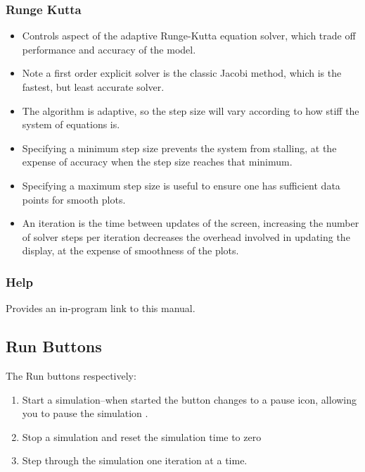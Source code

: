 \subsubsection{Runge Kutta}
\label{RungeKutta}

\begin{itemize}
\item Controls aspect of the adaptive Runge-Kutta equation solver, which
trade off performance and accuracy of the model. 
\item Note a first order explicit solver is the classic Jacobi method, which is the fastest,
but least accurate solver. 
\item The algorithm is adaptive, so the
step size will vary according to how stiff the system of equations
is. 
\item Specifying a minimum step size prevents the system from stalling,
at the expense of accuracy when the step size reaches that
minimum. 
\item Specifying a maximum step size is useful to ensure one has
sufficient data points for smooth plots.
\item An iteration is the time between updates of the screen, increasing the
number of solver steps per iteration decreases the overhead involved
in updating the display, at the expense of smoothness of the plots.
\end{itemize}

\subsubsection{Help}
\label{Help}

Provides an in-program link to this manual.

\subsection{Run Buttons}
\label{RunButtons}


The Run buttons respectively:
\begin{enumerate}
\item    Start a simulation--when started the button changes to a pause icon,
allowing you to pause the simulation .
\item Stop a simulation and reset the simulation time to zero
\item Step through the simulation one iteration at a time.
\end{enumerate}

